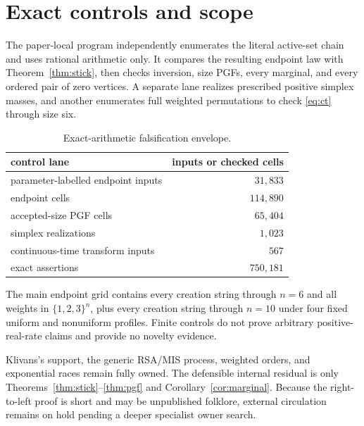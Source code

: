 \documentclass[10pt,a4paper]{amsart}
\theoremstyle{remark}
\begin{document}
\section{Exact controls and scope}

The paper-local program independently enumerates the literal active-set chain
and uses rational arithmetic only.  It compares the resulting endpoint law
with Theorem~\ref{thm:stick}, then checks inversion, size PGFs, every marginal,
and every ordered pair of zero vertices.  A separate lane realizes prescribed
positive simplex masses, and another enumerates full weighted permutations to
check \eqref{eq:ct} through size six.

\begin{table}[htbp]
\centering
\caption{Exact-arithmetic falsification envelope.}\label{tab:controls}
\begin{tabular}{lr}
\toprule
control lane & inputs or checked cells\\
\midrule
parameter-labelled endpoint inputs & $31{,}833$\\
endpoint cells & $114{,}890$\\
accepted-size PGF cells & $65{,}404$\\
simplex realizations & $1{,}023$\\
continuous-time transform inputs & $567$\\
exact assertions & $750{,}181$\\
\bottomrule
\end{tabular}
\end{table}

The main endpoint grid contains every creation string through $n=6$ and all
weights in $\{1,2,3\}^n$, plus every creation string through $n=10$ under four
fixed uniform and nonuniform profiles.  Finite controls do not prove arbitrary
positive-real-rate claims and provide no novelty evidence.

Klivans's support, the generic RSA/MIS process, weighted orders, and
exponential races remain fully owned.  The defensible internal residual is
only Theorems~\ref{thm:stick}--\ref{thm:pgf} and
Corollary~\ref{cor:marginal}.  Because the right-to-left proof is short and may
be unpublished folklore, external circulation remains on hold pending a
deeper specialist owner search.



\end{document}
